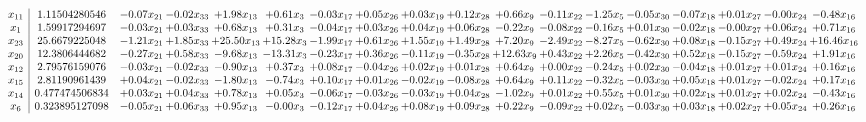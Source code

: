\documentclass[9pt]{article}
\begin{document}
 \[\begin{array}{c| c c@{\hskip 2pt} c@{\hskip 2pt} c@{\hskip 2pt} c@{\hskip 2pt} c@{\hskip 2pt} c@{\hskip 2pt} c@{\hskip 2pt} c@{\hskip 2pt} c@{\hskip 2pt} c@{\hskip 2pt} c@{\hskip 2pt} c@{\hskip 2pt} c@{\hskip 2pt} c@{\hskip 2pt} c@{\hskip 2pt} c@{\hskip 2pt} }
 x_{11}   &  1.11504280546 & -0.07 x_{21} & -0.02 x_{33} & +  1.98 x_{13} & +  0.61 x_{3} & -0.03 x_{17} & +  0.05 x_{26} & +  0.03 x_{19} & +  0.12 x_{28} & +  0.66 x_{9} & -0.11 x_{22} & -1.25 x_{5} & -0.05 x_{30} & -0.07 x_{18} & +  0.01 x_{27} & -0.00 x_{24} & -0.48 x_{16}\\
 x_{1}   &  1.59917294697 & -0.03 x_{21} & +  0.03 x_{33} & +  0.68 x_{13} & +  0.31 x_{3} & -0.04 x_{17} & +  0.03 x_{26} & +  0.04 x_{19} & +  0.06 x_{28} & -0.22 x_{9} & -0.08 x_{22} & -0.16 x_{5} & +  0.01 x_{30} & -0.02 x_{18} & -0.00 x_{27} & +  0.06 x_{24} & +  0.71 x_{16}\\
 x_{23}   &  25.6679225048 & -1.21 x_{21} & +  1.85 x_{33} & + 25.50 x_{13} & + 15.28 x_{3} & -1.99 x_{17} & +  0.61 x_{26} & +  1.55 x_{19} & +  1.49 x_{28} & +  7.20 x_{9} & -2.49 x_{22} & -8.27 x_{5} & -0.62 x_{30} & +  0.08 x_{18} & -0.15 x_{27} & +  0.49 x_{24} & + 16.46 x_{16}\\
 x_{20}   &  12.3806444682 & -0.27 x_{21} & +  0.58 x_{33} & -9.68 x_{13} & -13.31 x_{3} & -0.23 x_{17} & +  0.36 x_{26} & -0.11 x_{19} & -0.35 x_{28} & + 12.63 x_{9} & +  0.43 x_{22} & +  2.26 x_{5} & -0.42 x_{30} & +  0.52 x_{18} & -0.15 x_{27} & -0.59 x_{24} & +  1.91 x_{16}\\
 x_{12}   &  2.79576159076 & -0.03 x_{21} & -0.02 x_{33} & -0.90 x_{13} & +  0.37 x_{3} & +  0.08 x_{17} & -0.04 x_{26} & +  0.02 x_{19} & +  0.01 x_{28} & +  0.64 x_{9} & +  0.00 x_{22} & -0.24 x_{5} & +  0.02 x_{30} & -0.04 x_{18} & +  0.01 x_{27} & +  0.01 x_{24} & +  0.16 x_{16}\\
 x_{15}   &  2.81190961439 & +  0.04 x_{21} & -0.02 x_{33} & -1.80 x_{13} & -0.74 x_{3} & +  0.10 x_{17} & +  0.01 x_{26} & -0.02 x_{19} & -0.08 x_{28} & +  0.64 x_{9} & +  0.11 x_{22} & -0.32 x_{5} & -0.03 x_{30} & +  0.05 x_{18} & +  0.01 x_{27} & -0.02 x_{24} & +  0.17 x_{16}\\
 x_{14}   &  0.477474506834 & +  0.03 x_{21} & +  0.04 x_{33} & +  0.78 x_{13} & +  0.05 x_{3} & -0.06 x_{17} & -0.03 x_{26} & -0.03 x_{19} & +  0.04 x_{28} & -1.02 x_{9} & +  0.01 x_{22} & +  0.55 x_{5} & +  0.01 x_{30} & +  0.02 x_{18} & +  0.01 x_{27} & +  0.02 x_{24} & -0.43 x_{16}\\
 x_{6}   &  0.323895127098 & -0.05 x_{21} & +  0.06 x_{33} & +  0.95 x_{13} & -0.00 x_{3} & -0.12 x_{17} & +  0.04 x_{26} & +  0.08 x_{19} & +  0.09 x_{28} & +  0.22 x_{9} & -0.09 x_{22} & +  0.02 x_{5} & -0.03 x_{30} & +  0.03 x_{18} & +  0.02 x_{27} & +  0.05 x_{24} & +  0.26 x_{16}\\

\end{array}\]
\end{document}

